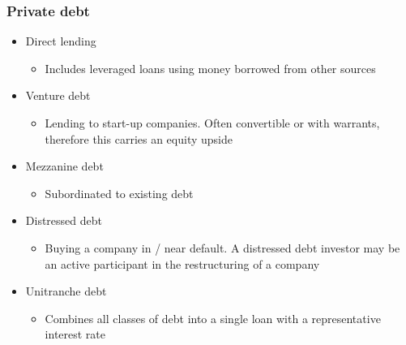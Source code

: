 \documentclass[../notes_compiled.tex]{subfiles}
\begin{document}
\subsubsection{Private debt}
\begin{itemize}
\item Direct lending
\begin{itemize}
\item Includes leveraged loans using money borrowed from other sources
\end{itemize}
\item Venture debt
\begin{itemize}
\item Lending to start-up companies. Often convertible or with warrants, therefore this carries an equity upside
\end{itemize}
\item Mezzanine debt
\begin{itemize}
\item Subordinated to existing debt
\end{itemize}
\item Distressed debt
\begin{itemize}
\item Buying a company in / near default. A distressed debt investor may be an active participant in the restructuring of a company
\end{itemize}
\item Unitranche debt
\begin{itemize}
\item Combines all classes of debt into a single loan with a representative interest rate
\end{itemize}
\end{itemize}
\end{document}
